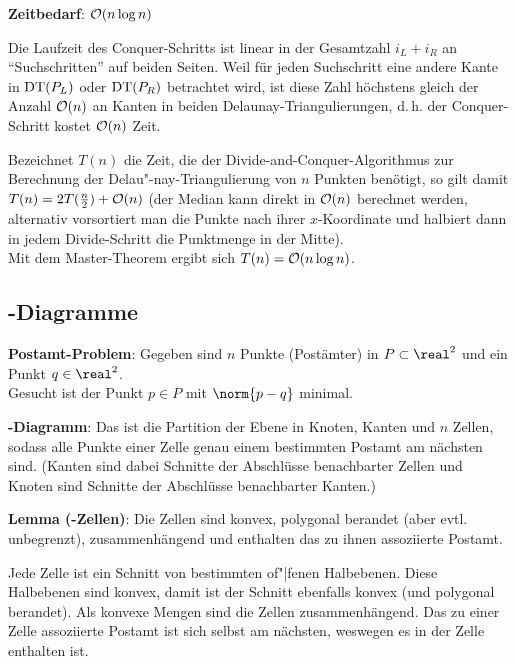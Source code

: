 \linie

\textbf{Zeitbedarf}:
$\mathcal{O}(n \log n)$

\begin{Beweis}
    Die Laufzeit des Conquer-Schritts ist linear in der Gesamtzahl $i_L + i_R$
    an "`Suchschritten"' auf beiden Seiten.
    Weil für jeden Suchschritt eine andere Kante in $\operatorname{DT}(P_L)$ oder $\operatorname{DT}(P_R)$ betrachtet wird,
    ist diese Zahl höchstens gleich der Anzahl $\mathcal{O}(n)$ an Kanten in beiden
    Delaunay-Triangulierungen,
    d.\,h. der Conquer-Schritt kostet $\mathcal{O}(n)$ Zeit.
    
    Bezeichnet $T(n)$ die Zeit, die der Divide-and-Conquer-Algorithmus zur Berechnung der
    Delau"-nay-Triangulierung von $n$ Punkten benötigt, so gilt damit
    $T(n) = 2T(\frac{n}{2}) + \mathcal{O}(n)$ (der Median kann direkt in $\mathcal{O}(n)$ berechnet werden,
    alternativ vorsortiert man die Punkte nach ihrer $x$-Koordinate und halbiert dann in jedem
    Divide-Schritt die Punktmenge in der Mitte).\\
    Mit dem Master-Theorem ergibt sich $T(n) = \mathcal{O}(n \log n)$.
\end{Beweis}

\pagebreak

\subsection{%
    -Diagramme%
}

\textbf{Postamt-Problem}:
Gegeben sind $n$ Punkte (Postämter) in $P \subset \real^2$ und ein Punkt $q \in \real^2$.\\
Gesucht ist der Punkt $p \in P$ mit $\norm{p - q}$ minimal.

\linie

\textbf{-Diagramm}:
Das  ist die Partition der Ebene
in Knoten, Kanten und $n$ Zellen,
sodass alle Punkte einer Zelle genau einem bestimmten Postamt am nächsten sind.
(Kanten sind dabei Schnitte der Abschlüsse benachbarter Zellen
und Knoten sind Schnitte der Abschlüsse benachbarter Kanten.)

\textbf{Lemma (-Zellen)}:
Die Zellen sind konvex, polygonal berandet (aber evtl. unbegrenzt),
zusammenhängend und enthalten das zu ihnen assoziierte Postamt.

\begin{Beweis}
    Jede Zelle ist ein Schnitt von bestimmten of"|fenen Halbebenen.
    Diese Halbebenen sind konvex, damit ist der Schnitt ebenfalls konvex
    (und polygonal berandet).
    Als konvexe Mengen sind die Zellen zusammenhängend.
    Das zu einer Zelle assoziierte Postamt ist sich selbst am nächsten, weswegen
    es in der Zelle enthalten ist.
\end{Beweis}

